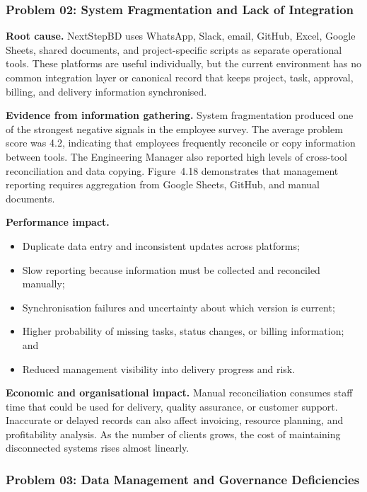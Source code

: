 \documentclass[12pt,a4paper]{report}
\begin{document}
\subsubsection{Problem 02: System Fragmentation and Lack of Integration}\label{sec:rc-fragmentation}

\textbf{Root cause.}
NextStepBD uses WhatsApp, Slack, email, GitHub, Excel, Google Sheets, shared documents, and
project-specific scripts as separate operational tools. These platforms are useful individually,
but the current environment has no common integration layer or canonical record that keeps
project, task, approval, billing, and delivery information synchronised.

\textbf{Evidence from information gathering.}
System fragmentation produced one of the strongest negative signals in the employee survey.
The average problem score was 4.2, indicating that employees frequently reconcile or copy
information between tools. The Engineering Manager also reported high levels of cross-tool
reconciliation and data copying. Figure~4.18 demonstrates that management reporting requires
aggregation from Google Sheets, GitHub, and manual documents.

\textbf{Performance impact.}
\begin{itemize}[leftmargin=1.6em]
    \item Duplicate data entry and inconsistent updates across platforms;
    \item Slow reporting because information must be collected and reconciled manually;
    \item Synchronisation failures and uncertainty about which version is current;
    \item Higher probability of missing tasks, status changes, or billing information; and
    \item Reduced management visibility into delivery progress and risk.
\end{itemize}

\textbf{Economic and organisational impact.}
Manual reconciliation consumes staff time that could be used for delivery, quality assurance,
or customer support. Inaccurate or delayed records can also affect invoicing, resource planning,
and profitability analysis. As the number of clients grows, the cost of maintaining disconnected
systems rises almost linearly.

\subsubsection{Problem 03: Data Management and Governance Deficiencies}\label{sec:rc-data}
\end{document}
